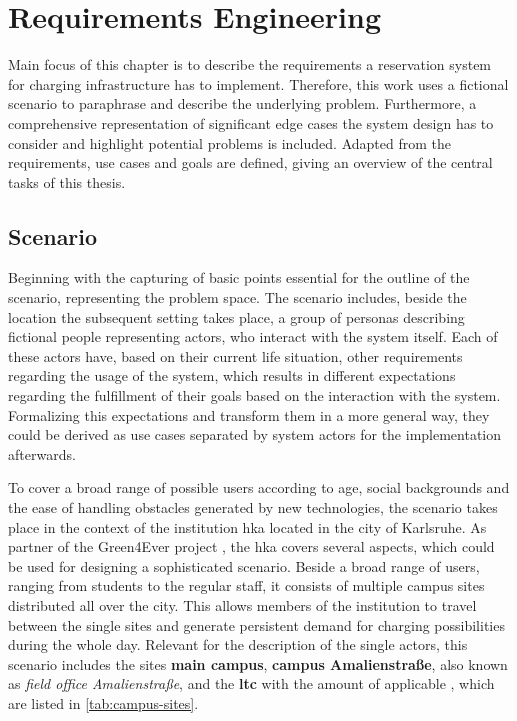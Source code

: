 
\chapter{Requirements Engineering}
\label{ch:Requirements Engineering}

Main focus of this chapter is to describe the requirements a reservation system for charging infrastructure has to implement.
Therefore, this work uses a fictional scenario to paraphrase and describe the underlying problem. Furthermore, a comprehensive representation of significant edge cases the system design has to consider and highlight potential problems is included.
Adapted from the requirements, use cases and goals are defined, giving an overview of the central tasks of this thesis.

\section{Scenario}
\label{ch:Requirements Engineering:sec:Scenario}

Beginning with the capturing of basic points essential for the outline of the scenario, representing the problem space.
The scenario includes, beside the location the subsequent setting takes place, a group of personas describing fictional people representing actors, who interact with the system itself.
Each of these actors have, based on their current life situation, other requirements regarding the usage of the system, which results in different expectations regarding the fulfillment of their goals based on the interaction with the system.
Formalizing this expectations and transform them in a more general way, they could be derived as use cases separated by system actors for the implementation afterwards.

\noindent To cover a broad range of possible users according to age, social backgrounds and the ease of handling obstacles generated by new technologies, the scenario takes place in the context of the institution \acrfull{hka} located in the city of Karlsruhe.
As partner of the Green4Ever project \cite{noauthor_hka_nodate}, the \acrshort{hka} covers several aspects, which could be used for designing a sophisticated scenario. Beside a broad range of users, ranging from students to the regular staff, it consists of multiple campus sites distributed all over the city.
This allows members of the institution to travel between the single sites and generate persistent demand for charging possibilities during the whole day.
Relevant for the description of the single actors, this scenario includes the sites \textbf{main campus}, \textbf{campus Amalienstraße}, also known as \textit{field office Amalienstraße}, and the \textbf{\acrfull{ltc}} with the amount of applicable , which are listed in \ref{tab:campus-sites}.

